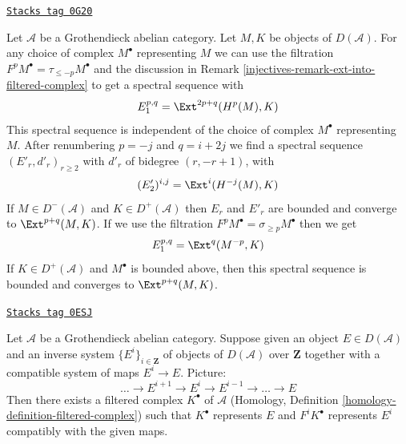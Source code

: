 \begin{remark}
\label{injectives-remark-spectral-sequences-ext-variant}
\href{https://stacks.math.columbia.edu/tag/0G20}{\texttt{Stacks tag 0G20}}

Let $\mathcal{A}$ be a Grothendieck abelian category.
Let $M, K$ be objects of $D(\mathcal{A})$.
For any choice of complex $M^\bullet$ representing $M$ we
can use the filtration $F^pM^\bullet = \tau_{\leq -p}M^\bullet$
and the discussion in Remark \ref{injectives-remark-ext-into-filtered-complex}
to get a spectral sequence with
$$
E_1^{p, q} = \Ext^{2p + q}(H^p(M), K)
$$
This spectral sequence is independent of the choice of complex $M^\bullet$
representing $M$. After renumbering $p = -j$ and $q = i + 2j$ we find a
spectral sequence $(E'_r, d'_r)_{r \geq 2}$ with $d'_r$ of bidegree
$(r, -r + 1)$, with
$$
(E'_2)^{i, j} = \Ext^i(H^{-j}(M), K)
$$
If $M \in D^-(\mathcal{A})$ and $K \in D^+(\mathcal{A})$
then $E_r$ and $E'_r$ are bounded and converge to $\Ext^{p + q}(M, K)$.
If we use the filtration $F^pM^\bullet = \sigma_{\geq p}M^\bullet$
then we get
$$
E_1^{p, q} = \Ext^q(M^{-p}, K)
$$
If $K \in D^+(\mathcal{A})$ and $M^\bullet$ is bounded above, then
this spectral sequence is bounded and converges to $\Ext^{p + q}(M, K)$.
\end{remark}

\begin{lemma}
\label{injectives-lemma-represent-by-filtered-complex}
\href{https://stacks.math.columbia.edu/tag/0ESJ}{\texttt{Stacks tag 0ESJ}}

Let $\mathcal{A}$ be a Grothendieck abelian category. Suppose given an object
$E \in D(\mathcal{A})$ and an inverse system $\{E^i\}_{i \in \mathbf{Z}}$
of objects of $D(\mathcal{A})$ over $\mathbf{Z}$ together with
a compatible system of maps $E^i \to E$. Picture:
$$
\ldots \to E^{i + 1} \to E^i \to E^{i - 1} \to \ldots \to E
$$
Then there exists a filtered complex $K^\bullet$ of $\mathcal{A}$
(Homology, Definition \ref{homology-definition-filtered-complex})
such that $K^\bullet$ represents $E$
and $F^iK^\bullet$ represents $E^i$ compatibly with the given maps.
\end{lemma}

